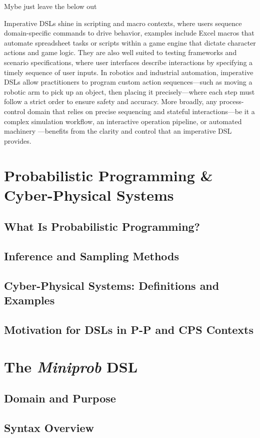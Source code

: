 \documentclass[11pt]{report}
\begin{document}
Mybe just leave the below out

Imperative DSLs shine in scripting and macro contexts, where users sequence domain-specific commands to drive behavior, examples include Excel macros that
automate spreadsheet tasks or scripts within a game engine that dictate character actions and game logic. They are also well suited to testing frameworks
and scenario specifications, where user interfaces describe interactions by specifying a timely sequence of user inputs. In robotics and industrial automation, 
imperative DSLs allow practitioners to program custom action sequences—such as moving a robotic arm
to pick up an object, then placing it precisely—where each step must follow a strict order to ensure safety and accuracy. More broadly, any process-control 
domain that relies on precise sequencing and stateful interactions—be it a complex simulation workflow, an interactive operation pipeline, or automated machinery
—benefits from the clarity and control that an imperative DSL provides.

\chapter{Probabilistic Programming \& Cyber-Physical Systems}
\section{What Is Probabilistic Programming?}
\section{Inference and Sampling Methods}
\section{Cyber-Physical Systems: Definitions and Examples}
\section{Motivation for DSLs in P-P and CPS Contexts}

\chapter{The \textit{Miniprob} DSL}
\section{Domain and Purpose}
\section{Syntax Overview}
\end{document}
